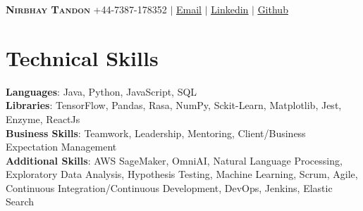 \documentclass[letterpaper,11pt]{article}
\begin{document}

\begin{center}
    \textbf{\Huge \scshape Nirbhay Tandon} \hspace{135pt} \vspace{1pt} \small +44-7387-178352  $|$ \href{mailto:nirbaay.tandon@jpmorgan.com}{\underline{Email}} $|$ \href{https://www.linkedin.com/in/nirbaay}{\underline{Linkedin}} $|$
    \href{https://github.com/nirbaaytandon}{\underline{Github}}
\end{center}



\section{Technical Skills}
\begin{itemize}[leftmargin=0.1in, label={}]
	\small{\item{
			\textbf{Languages}{: Java, Python, JavaScript, SQL} \\
			\textbf{Libraries}{: TensorFlow, Pandas, Rasa, NumPy, Sckit-Learn, Matplotlib, Jest, Enzyme, ReactJs}\\
			\textbf{Business Skills}{: Teamwork, Leadership, Mentoring, Client/Business Expectation Management}\\
			\textbf{Additional Skills}{: AWS SageMaker, OmniAI, Natural Language Processing, Exploratory Data Analysis, Hypothesis Testing, Machine Learning, Scrum, Agile, Continuous Integration/Continuous Development, DevOps, Jenkins, Elastic Search
} \\
	}}
\end{itemize}

\end{document}
